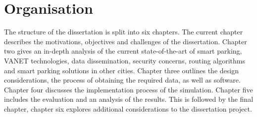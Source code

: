 \section{Organisation}
The structure of the dissertation is split into six chapters. The current chapter describes the motivations, objectives and challenges of the dissertation. Chapter two gives an in-depth analysis of the current state-of-the-art of smart parking, \ac{VANET} technologies, data dissemination, security concerns, routing algorithms and smart parking solutions in other cities. Chapter three outlines the design considerations, the process of obtaining the required data, as well as software. Chapter four discusses the implementation process of the simulation. Chapter five includes the evaluation and an analysis of the results. This is followed by the final chapter, chapter six explores additional considerations to the dissertation project.